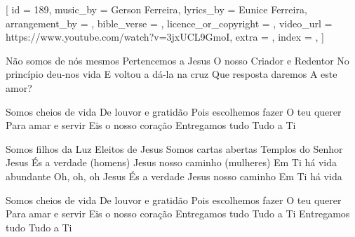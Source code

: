 [
    id                     = {189},
    music_by               = {Gerson Ferreira},
    lyrics_by              = {Eunice Ferreira},
    arrangement_by         = {},
    bible_verse            = {},
    licence_or_copyright   = {},
    video_url              = {https://www.youtube.com/watch?v=3jxUCL9GmoI},
    extra                  = {},
    index                  = {},
]


\beginverse
Não somos de nós mesmos 
Pertencemos a Jesus
O nosso Criador e Redentor
No princípio deu-nos vida
E voltou a dá-la na cruz
Que resposta daremos
A este amor?
\endverse


\beginchorus
Somos cheios de vida
De louvor e gratidão 
Pois escolhemos fazer 
O teu querer
Para amar e servir
Eis o nosso coração 
Entregamos tudo 
Tudo a Ti
\endchorus


\beginverse
Somos filhos da Luz
Eleitos de Jesus
Somos cartas abertas
Templos do Senhor
Jesus És a verdade (homens) 
Jesus nosso caminho (mulheres)
Em Ti há vida abundante
Oh, oh, oh
Jesus És a verdade
Jesus nosso caminho
Em Ti há vida 
\endverse


\beginchorus
Somos cheios de vida
De louvor e gratidão 
Pois escolhemos fazer 
O teu querer
Para amar e servir
Eis o nosso coração 
Entregamos tudo 
Tudo a Ti
Entregamos tudo 
Tudo a Ti
\endchorus

\endsong
